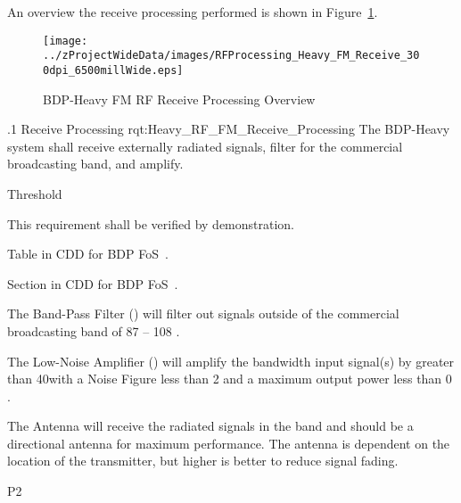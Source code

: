 An overview the \FM \RF receive processing performed is shown in Figure~\ref{fig:Heavy_RF_Processing_FM_Receive}.

\begin{figure}[htbp]
	\centering
		\texttt{[image: ../zProjectWideData/images/RFProcessing\_Heavy\_FM\_Receive\_300dpi\_6500millWide.eps]}
	\caption[BDP-Heavy FM RF Receive Processing Overview]{BDP-Heavy FM RF Receive Processing Overview}
	\label{fig:Heavy_RF_Processing_FM_Receive}
\end{figure}

\ONERQMTV
{\RqtNumberBase.1}
{\ThisSubSegment Receive Processing}
{rqt:Heavy_RF_FM_Receive_Processing}
{The BDP-Heavy system shall receive externally radiated \RF signals, filter for the commercial \FM broadcasting band, and amplify.}
{
	\item [Phase 1] Threshold
}
{This requirement shall be verified by demonstration.}
{
	\item [5.4] Table in CDD for BDP FoS~\cite{ref__BDP_FOS_CDD}.
	\item [5.5.5] Section in CDD for BDP FoS~\cite{ref__BDP_FOS_CDD}.
}
{
	\item The Band-Pass Filter (\BPF) will filter out signals outside of the commercial \FM broadcasting band of 87 – 108 \MHz.
	\item The Low-Noise Amplifier (\LNA) will amplify the \FM bandwidth input signal(s) by greater than 40\dB with a Noise Figure less than 2 \dB and a maximum output power less than 0 \dBm.
	\item The Antenna will receive the radiated \RF signals in the \FM band and should be a directional antenna for maximum performance. The antenna \HAAT is dependent on the location of the transmitter, but higher is better to reduce signal fading.
}
{P2}

